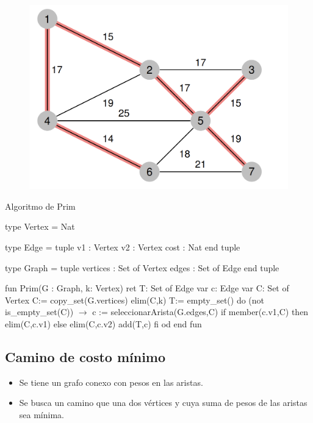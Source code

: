 \begin{figure}[h]
    \centering
    \includegraphics[scale=0.5]{estáticos/figura7.png}
\end{figure}

\begin{codebox}{Algoritmo de Prim}
\begin{pascallike}
type Vertex = Nat

type Edge = tuple
                v1 : Vertex
                v2 : Vertex
                cost : Nat
            end tuple

type Graph = tuple
                vertices : Set of Vertex
                edges : Set of Edge
            end tuple

fun Prim(G : Graph, k: Vertex) ret T: Set of Edge
    var c: Edge
    var C: Set of Vertex
    C:= copy_set(G.vertices)
    elim(C,k)
    T:= empty_set()
    do (not is\_empty\_set(C)) $\rightarrow$
        c := seleccionarArista(G.edges,C)
        if member(c.v1,C) then 
            elim(C,c.v1)
        else elim(C,c.v2)
        add(T,c)
        fi
    od
end fun
\end{pascallike}
\end{codebox}

\subsection{Camino de costo mínimo}

\begin{itemize}
    \item Se tiene un grafo conexo con pesos en las aristas.
    \item Se busca un camino que una dos vértices y cuya suma de pesos de las aristas sea mínima.
\end{itemize}

